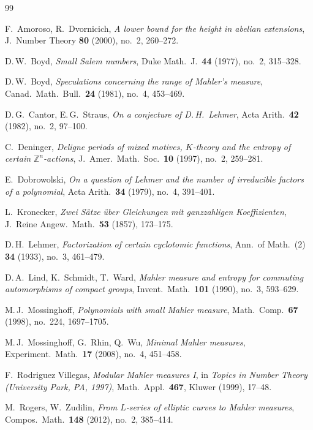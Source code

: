 \documentclass[12pt,a4paper]{amsart}
\theoremstyle{definition}
\theoremstyle{remark}
\begin{document}
\begin{thebibliography}{99}

F.\ Amoroso, R.\ Dvornicich,
\textit{A lower bound for the height in abelian extensions},
J.\ Number Theory \textbf{80} (2000), no.\ 2, 260--272.

D.\,W.\ Boyd,
\textit{Small Salem numbers},
Duke Math.\ J.\ \textbf{44} (1977), no.\ 2, 315--328.

D.\,W.\ Boyd,
\textit{Speculations concerning the range of Mahler's measure},
Canad.\ Math.\ Bull.\ \textbf{24} (1981), no.\ 4, 453--469.

D.\,G.\ Cantor, E.\,G.\ Straus,
\textit{On a conjecture of D.\,H.\ Lehmer},
Acta Arith.\ \textbf{42} (1982), no.\ 2, 97--100.

C.\ Deninger,
\textit{Deligne periods of mixed motives, $K$-theory and the entropy of certain
$\mathbb{Z}^n$-actions},
J.\ Amer.\ Math.\ Soc.\ \textbf{10} (1997), no.\ 2, 259--281.

E.\ Dobrowolski,
\textit{On a question of Lehmer and the number of irreducible factors of a polynomial},
Acta Arith.\ \textbf{34} (1979), no.\ 4, 391--401.

L.\ Kronecker,
\textit{Zwei Sätze über Gleichungen mit ganzzahligen Koeffizienten},
J.\ Reine Angew.\ Math.\ \textbf{53} (1857), 173--175.

D.\,H.\ Lehmer,
\textit{Factorization of certain cyclotomic functions},
Ann.\ of Math.\ (2) \textbf{34} (1933), no.\ 3, 461--479.

D.\,A.\ Lind, K.\ Schmidt, T.\ Ward,
\textit{Mahler measure and entropy for commuting automorphisms of compact groups},
Invent.\ Math.\ \textbf{101} (1990), no.\ 3, 593--629.

M.\,J.\ Mossinghoff,
\textit{Polynomials with small Mahler measure},
Math.\ Comp.\ \textbf{67} (1998), no.\ 224, 1697--1705.

M.\,J.\ Mossinghoff, G.\ Rhin, Q.\ Wu,
\textit{Minimal Mahler measures},
Experiment.\ Math.\ \textbf{17} (2008), no.\ 4, 451--458.

F.\ Rodriguez Villegas,
\textit{Modular Mahler measures I},
in \textit{Topics in Number Theory (University Park, PA, 1997)},
Math.\ Appl.\ \textbf{467}, Kluwer (1999), 17--48.

M.\ Rogers, W.\ Zudilin,
\textit{From $L$-series of elliptic curves to Mahler measures},
Compos.\ Math.\ \textbf{148} (2012), no.\ 2, 385--414.


\end{thebibliography}
\end{document}
